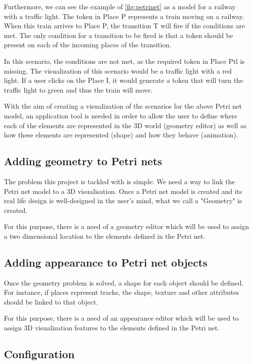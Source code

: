 Furthermore, we can see the example of \ref{fig:petrinet} as a model for a railway with a traffic light. The token in Place P represents a train moving on a railway. When this train arrives to Place P, the transition T will fire if the conditions are met. The only condition for a transition to be fired is that a token should be present on each of the incoming places of the transition.

In this scenario, the conditions are not met, as the required token in Place Ptl is missing. The visualization of this scenario would be a traffic light with a red light. If a user clicks on the Place I, it would generate a token that will turn the traffic light to green and thus the train will move.

With the aim of creating a visualization of the scenarios for the above Petri net model, an application tool is needed in order to allow the user to define where each of the elements are represented in the 3D world (geometry editor) as well as how these elements are represented (shape) and how they behave (animation). 

\subsection{Adding geometry to Petri nets}
The problem this project is tackled with is simple: We need a way to link the Petri net model to a 3D visualisation. Once a Petri net model is created and its real life design is well-designed in the user's mind, what we call a "Geometry" is created.

For this purpose, there is a need of a geometry editor which will be used to assign a two dimensional location to the elements defined in the Petri net.

\subsection{Adding appearance to Petri net objects}
\label{sec:appearance}

Once the geometry problem is solved, a shape for each object should be defined. For instance, if places represent tracks, the shape, texture and other attributes should be linked to that object.

For this purpose, there is a need of an appearance editor which will be used to assign 3D visualization features to the elements defined in the Petri net.

\subsection{Configuration}

